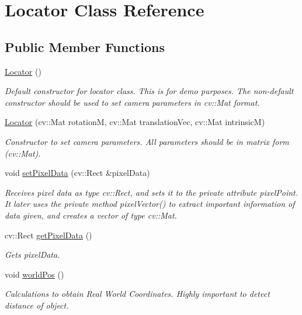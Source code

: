 \hypertarget{classLocator}{}\section{Locator Class Reference}
\label{classLocator}
\subsection*{Public Member Functions}
\begin{DoxyCompactItemize}
\item 
\hyperlink{classLocator_a309b4d4180297ebe1a15c3ddff22bb0a}{Locator} ()
\begin{DoxyCompactList}\small\item\em Default constructor for locator class. This is for demo purposes. The non-\/default constructor should be used to set camera parameters in cv\+::\+Mat format. \end{DoxyCompactList}\item 
\hyperlink{classLocator_a2a33d04a9b0355c7a60f2c5e7114689a}{Locator} (cv\+::\+Mat rotationM, cv\+::\+Mat translation\+Vec, cv\+::\+Mat intrinsicM)
\begin{DoxyCompactList}\small\item\em Constructor to set camera parameters. All parameters should be in matrix form (cv\+::\+Mat). \end{DoxyCompactList}\item 
void \hyperlink{classLocator_a2a1903c4adab7ebecd1f4790a135a39a}{set\+Pixel\+Data} (cv\+::\+Rect \&pixel\+Data)
\begin{DoxyCompactList}\small\item\em Receives pixel data as type cv\+::\+Rect, and sets it to the private attribute pixel\+Point. It later uses the private method pixel\+Vector() to extract important information of data given, and creates a vector of type cv\+::\+Mat. \end{DoxyCompactList}\item 
cv\+::\+Rect \hyperlink{classLocator_abe66e0f8d5c7786be8c2154bfab43fc1}{get\+Pixel\+Data} ()
\begin{DoxyCompactList}\small\item\em Gets pixel\+Data. \end{DoxyCompactList}\item 
void \hyperlink{classLocator_a9c7db372b262aac0f02c774ac3753e10}{world\+Pos} ()
\begin{DoxyCompactList}\small\item\em Calculations to obtain Real World Coordinates. Highly important to detect distance of object. \end{DoxyCompactList}\item 

\end{DoxyCompactItemize}
